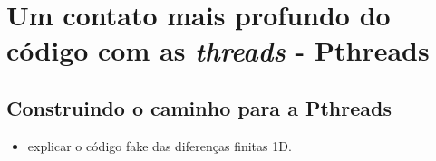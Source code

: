 \section{Um contato mais profundo do código com as \textit{threads} - Pthreads}

\subsection{Construindo o caminho para a Pthreads}

\begin{itemize}
	\item explicar o código fake das diferenças finitas 1D.
\end{itemize}
